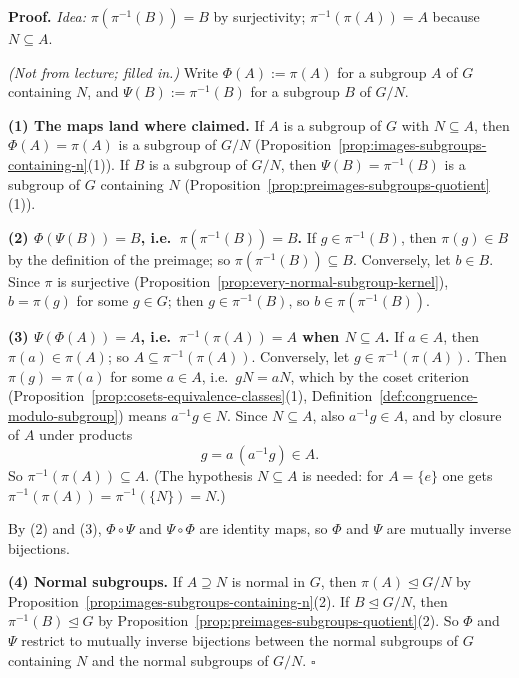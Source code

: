 \documentclass[11pt]{report}
\renewenvironment{proof}[1][Proof]{\noindent\textbf{#1.} }{\hfill$\square$\par\vspace{5pt}}
\begin{document}
\begin{proof}
\textit{Idea:} $\pi(\pi^{-1}(B)) = B$ by surjectivity; $\pi^{-1}(\pi(A)) = A$ because $N \subseteq A$.\par
\textit{(Not from lecture; filled in.)} Write $\Phi(A) := \pi(A)$ for a subgroup $A$ of $G$ containing $N$, and $\Psi(B) := \pi^{-1}(B)$ for a subgroup $B$ of $G/N$.

\textbf{(1) The maps land where claimed.} If $A$ is a subgroup of $G$ with $N \subseteq A$, then $\Phi(A) = \pi(A)$ is a subgroup of $G/N$ (Proposition~\ref{prop:images-subgroups-containing-n}(1)). If $B$ is a subgroup of $G/N$, then $\Psi(B) = \pi^{-1}(B)$ is a subgroup of $G$ containing $N$ (Proposition~\ref{prop:preimages-subgroups-quotient}(1)).

\textbf{(2) $\Phi(\Psi(B)) = B$, i.e.\ $\pi(\pi^{-1}(B)) = B$.} If $g \in \pi^{-1}(B)$, then $\pi(g) \in B$ by the definition of the preimage; so $\pi(\pi^{-1}(B)) \subseteq B$. Conversely, let $b \in B$. Since $\pi$ is surjective (Proposition~\ref{prop:every-normal-subgroup-kernel}), $b = \pi(g)$ for some $g \in G$; then $g \in \pi^{-1}(B)$, so $b \in \pi(\pi^{-1}(B))$.

\textbf{(3) $\Psi(\Phi(A)) = A$, i.e.\ $\pi^{-1}(\pi(A)) = A$ when $N \subseteq A$.} If $a \in A$, then $\pi(a) \in \pi(A)$; so $A \subseteq \pi^{-1}(\pi(A))$. Conversely, let $g \in \pi^{-1}(\pi(A))$. Then $\pi(g) = \pi(a)$ for some $a \in A$, i.e.\ $gN = aN$, which by the coset criterion (Proposition~\ref{prop:cosets-equivalence-classes}(1), Definition~\ref{def:congruence-modulo-subgroup}) means $a^{-1}g \in N$. Since $N \subseteq A$, also $a^{-1}g \in A$, and by closure of $A$ under products
\[ g = a\,(a^{-1}g) \in A . \]
So $\pi^{-1}(\pi(A)) \subseteq A$. (The hypothesis $N \subseteq A$ is needed: for $A = \{e\}$ one gets $\pi^{-1}(\pi(A)) = \pi^{-1}(\{N\}) = N$.)

By (2) and (3), $\Phi \circ \Psi$ and $\Psi \circ \Phi$ are identity maps, so $\Phi$ and $\Psi$ are mutually inverse bijections.

\textbf{(4) Normal subgroups.} If $A \supseteq N$ is normal in $G$, then $\pi(A) \trianglelefteq G/N$ by Proposition~\ref{prop:images-subgroups-containing-n}(2). If $B \trianglelefteq G/N$, then $\pi^{-1}(B) \trianglelefteq G$ by Proposition~\ref{prop:preimages-subgroups-quotient}(2). So $\Phi$ and $\Psi$ restrict to mutually inverse bijections between the normal subgroups of $G$ containing $N$ and the normal subgroups of $G/N$.
\end{proof}
\end{document}
